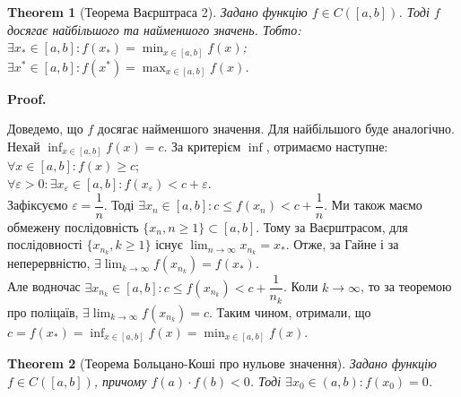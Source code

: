 \documentclass[a4paper, 14pt]{article}
\makeatletter
\def\qed{$\blacksquare$}
\theoremstyle{theoremdd}
\newtheorem{theorem}{Theorem}[subsection]
\theoremstyle{theoremdd}
\theoremstyle{theoremdd}
\theoremstyle{theoremdd}
\theoremstyle{theoremdd}
\theoremstyle{theoremdd}
\theoremstyle{theoremdd}
\theoremstyle{theoremdd}
\renewenvironment{proof}[1][Proof.\\]{\par
\pushQED{\hfill \qed}%
\normalfont \topsep6\p@\@plus6\p@\relax
\trivlist
\item\relax
{\bfseries
#1\@addpunct{.}}\hspace\labelsep\ignorespaces
}{%
\popQED\endtrivlist\@endpefalse
}
\makeatother
\begin{document}
\begin{theorem}[Теорема Ваєрштраса 2]
Задано функцію $f \in C([a,b])$. Тоді $f$ досягає найбільшого та найменшого значень. Тобто:\\
$\displaystyle \exists x_* \in [a,b]: f(x_*) = \min_{x \in [a,b]} f(x)$;\\
$\displaystyle \exists x^* \in [a,b]: f(x^*) = \max_{x \in [a,b]} f(x)$.
\end{theorem}

\begin{proof}
Доведемо, що $f$ досягає найменшого значення. Для найбільшого буде аналогічно.\\
Нехай $\displaystyle \inf_{x \in [a,b]} f(x) = c$. За критерієм $\inf$, отримаємо наступне:\\
$\forall x \in [a,b]: f(x) \geq c$;\\
$\forall \varepsilon > 0: \exists x_{\varepsilon} \in [a,b]: f(x_{\varepsilon}) < c + \varepsilon$.\\
Зафіксуємо $\varepsilon = \dfrac{1}{n}$. Тоді $\exists x_n \in [a,b]: c \leq f(x_n) < c + \dfrac{1}{n}$. Ми також маємо обмежену послідовність $\{x_n, n \geq 1\} \subset [a,b]$. Тому за Ваєрштрасом, для послідовності $\{x_{n_k},k \geq 1\}$ існує $\displaystyle \lim_{n \to \infty} x_{n_k} = x_*$. Отже, за Гайне і за неперервністю, $\displaystyle \exists \lim_{k \to \infty} f(x_{n_k}) = f(x_*)$.\\
Але водночас $\exists x_{n_k} \in [a,b]: c \leq f(x_{n_k}) < c + \dfrac{1}{n_k}$. Коли $k \to \infty$, то за теоремою про поліцаїв, $\exists \displaystyle \lim_{k \to \infty} f(x_{n_k}) = c$. Таким чином, отримали, що $c = f(x_*) = \displaystyle \inf_{x \in [a,b]} f(x) = \min_{x \in [a,b]} f(x)$.
\end{proof}

\begin{theorem}[Теорема Больцано-Коші про нульове значення]
Задано функцію $f \in C([a,b])$, причому $f(a) \cdot f(b) < 0$. Тоді $\exists x_0 \in (a,b): f(x_0) = 0$.
\\ \iffalse %
\begin{figure}[H]
\centering
\begin{tikzpicture}
\draw[thick,->] (-0.5,0)--(4.5,0) node[anchor=north west] {$x$};
\draw[thick,->] (0,-1.5)--(0,2.5) node[anchor=east] {$y$};
\draw [thick] plot [smooth] coordinates {(0.5,-1) (1,-0.5) (1.2,-1.2) (1.8,0.5) (2.5,-0.3) (4, 2)} node[anchor = south] {$f(x)$};
\draw [dashed] (4,2)--(0,2) node[anchor = east] {$f(b)$};
\draw [dashed] (0.5,-1)--(0,-1) node[anchor = east] {$f(a)$};
\fill[red] (2.76,0) circle (1pt) node[black, scale = 0.8] at (2.796,-0.3) {$x_0$};
\end{tikzpicture}
\caption*{В цьому випадку $f(a) < 0, f(b) > 0$}
\end{figure}
\fi %
\end{theorem}
\end{document}
